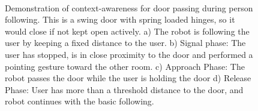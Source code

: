 \documentclass[3p]{elsarticle}
\begin{document}
\begin{figure}[ht!]
\centering
%
         \\
    \caption{Demonstration of context-awareness for door passing during person following. This is a swing door with spring loaded hinges, so it would close if not kept open actively. a) The robot is following the user by keeping a fixed distance to the user. b) Signal phase: The user has stopped, is in close proximity to the door and performed a pointing gesture toward the other room. c) Approach Phase: The robot passes the door while the user is holding the door d) Release Phase: User has more than a threshold distance to the door, and robot continues with the basic following.}
   \label{fig:situtation_aware_door_passing}
\end{figure}
\end{document}
